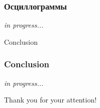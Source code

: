 \documentclass{beamer}
\begin{document}
	\begin{frame}
		\frametitle{Осциллограммы}
		
		\begin{center}
			\huge {} \textit{in progress...}
		\end{center}
		
	\end{frame}
	
	\begin{frame}[plain,c]
		
		\begin{center}
			\huge {} Conclusion
		\end{center}
		
	\end{frame}
	
	\begin{frame}
		\frametitle{Conclusion}
		
		\begin{center}
			\huge {} \textit{in progress...}
		\end{center}
		
	\end{frame}
	
	
	\begin{frame}[plain,c]
		
		\begin{center}
			\huge {} Thank you for your attention!
		\end{center}
		
	\end{frame}
\end{document}
